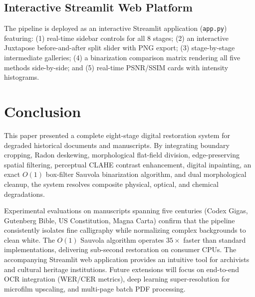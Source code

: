 \documentclass[11pt, a4paper]{article}
\begin{document}
\subsection{Interactive Streamlit Web Platform}
The pipeline is deployed as an interactive Streamlit application (\texttt{app.py}) featuring: (1) real-time sidebar controls for all 8 stages; (2) an interactive Juxtapose before-and-after split slider with PNG export; (3) stage-by-stage intermediate galleries; (4) a binarization comparison matrix rendering all five methods side-by-side; and (5) real-time PSNR/SSIM cards with intensity histograms.

\section{Conclusion}

This paper presented a complete eight-stage digital restoration system for degraded historical documents and manuscripts. By integrating boundary cropping, Radon deskewing, morphological flat-field division, edge-preserving spatial filtering, perceptual CLAHE contrast enhancement, digital inpainting, an exact $O(1)$ box-filter Sauvola binarization algorithm, and dual morphological cleanup, the system resolves composite physical, optical, and chemical degradations.

Experimental evaluations on manuscripts spanning five centuries (Codex Gigas, Gutenberg Bible, US Constitution, Magna Carta) confirm that the pipeline consistently isolates fine calligraphy while normalizing complex backgrounds to clean white. The $O(1)$ Sauvola algorithm operates $35\times$ faster than standard implementations, delivering sub-second restoration on consumer CPUs. The accompanying Streamlit web application provides an intuitive tool for archivists and cultural heritage institutions. Future extensions will focus on end-to-end OCR integration (WER/CER metrics), deep learning super-resolution for microfilm upscaling, and multi-page batch PDF processing.
\end{document}
